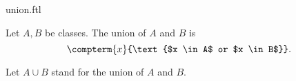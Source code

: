 \documentclass{article}
\begin{document}
\begin{smodule}{union.ftl}

  \begin{definition}[label=2159753924968448]
    Let $A, B$ be classes.
    The union of $A$ and $B$ is
    \[\compterm{x}{\text{$x \in A$ or $x \in B$}}.\]
  \end{definition}

  \begin{fconvention*}
    Let $A \cup B$ stand for the union of $A$ and $B$.
  \end{fconvention*}
\end{smodule}
\end{document}
